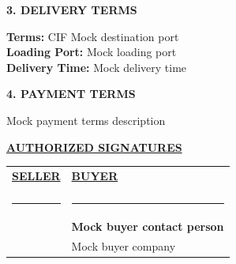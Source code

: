 \documentclass[a4paper,11pt]{article}
\begin{document}
\vspace{0.5cm}
\begin{center}{\large\textbf{\color{marooncolor}3. DELIVERY TERMS}}\end{center}
\vspace{0.2cm}
\noindent \textbf{Terms:} CIF Mock destination port\\
\textbf{Loading Port:} Mock loading port\\
\textbf{Delivery Time:} Mock delivery time

\vspace{0.5cm}
\begin{center}{\large\textbf{\color{marooncolor}4. PAYMENT TERMS}}\end{center}
\vspace{0.2cm}
\noindent Mock payment terms description

\vspace{1.5cm}
\begin{center}{\large\textbf{\underline{AUTHORIZED SIGNATURES}}}\end{center}
\vspace{1cm}

\noindent
\begin{tabularx}{\textwidth}{@{}X X@{}}
\textbf{\underline{SELLER}} & \textbf{\underline{BUYER}} \\
\vspace{2cm} & \vspace{2cm} \\
\rule{6cm}{0.4pt} & \rule{6cm}{0.4pt} \\
\textbf{} & \textbf{Mock buyer contact person} \\
 & Mock buyer company
\end{tabularx}
\end{document}

